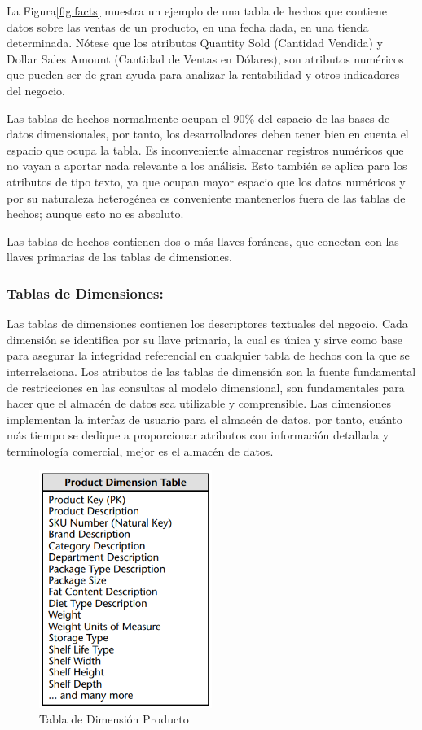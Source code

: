 La Figura\ref{fig:facts} muestra un ejemplo de una tabla de hechos que contiene datos sobre las ventas de un producto, en una fecha dada, 
en una tienda determinada. N\'otese que los atributos Quantity Sold (Cantidad Vendida) y Dollar Sales Amount (Cantidad de 
Ventas en Dólares), son atributos num\'ericos que pueden ser de gran ayuda para analizar la rentabilidad y otros indicadores 
del negocio. 

Las tablas de hechos normalmente ocupan el $90\%$\cite{kimball2011data} del espacio de las bases de datos dimensionales, por tanto, 
los desarrolladores deben tener bien en cuenta el espacio que ocupa la tabla. Es inconveniente almacenar 
registros num\'ericos que no vayan a aportar nada relevante a los an\'alisis. Esto tambi\'en se aplica para los atributos 
de tipo texto, ya que ocupan mayor espacio que los datos num\'ericos y por su naturaleza heterog\'enea es conveniente 
mantenerlos fuera de las tablas de hechos; aunque esto no es absoluto\cite{kimball2011data}.

Las tablas de hechos contienen dos o m\'as llaves for\'aneas, que conectan con las llaves primarias de las tablas de 
dimensiones.
%
\subsubsection{Tablas de Dimensiones: }
%
Las tablas de dimensiones contienen los descriptores textuales del negocio. Cada dimensión se identifica por su llave 
primaria, la cual es \'unica y sirve como base para asegurar la integridad referencial en cualquier tabla de hechos con 
la que se interrelaciona. Los atributos de las tablas de dimensi\'on son la fuente fundamental de restricciones en las 
consultas al modelo dimensional, son fundamentales para hacer que el almacén de datos sea utilizable y comprensible. Las 
dimensiones implementan la interfaz de usuario para el almacén de datos, por tanto, cuánto más tiempo se dedique a 
proporcionar atributos con información detallada y terminología comercial, mejor es el almacén de datos.

\begin{figure}[ht]
    \centering
    \includegraphics[width=0.5\textwidth]{../document/Graphics/dimension.png}
    \caption{Tabla de Dimensi\'on Producto \cite{kimball2011data}}
    \label{fig:dimension}
  \end{figure}

